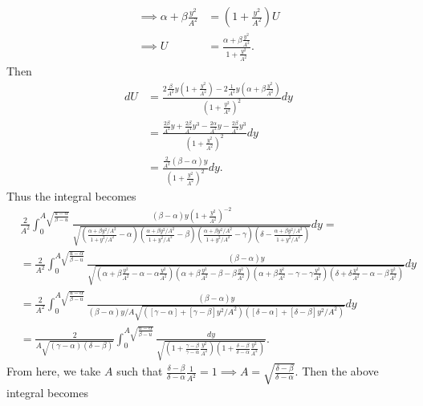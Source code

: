 \documentclass{article}
\begin{document}
\begin{itemize}
\begin{itemize}
\begin{align*}
            \implies \alpha + \beta\frac{y^2}{A^2} &= \left(1 + \frac{y^2}{A^2}\right)U\\
            \implies U &= \frac{\alpha + \beta \frac{y^2}{A^2}}{1 + \frac{y^2}{A^2}}.
        \end{align*}
        Then
        \begin{align*}
            dU &= \frac{2\frac{\beta}{A^2}y\left(1 + \frac{y^2}{A^2}\right) - 2\frac{1}{A^2}y\left(\alpha + \beta\frac{y^2}{A^2}\right)}{\left(1 + \frac{y^2}{A^2}\right)^2}dy\\
            &= \frac{\frac{2\beta}{A^2}y + \frac{2\beta}{A^4}y^3 - \frac{2\alpha}{A^2}y - \frac{2\beta}{A^4}y^3}{\left(1 + \frac{y^2}{A^2}\right)^2}dy\\
            &= \frac{\frac{2}{A^2}(\beta - \alpha)y}{\left(1 + \frac{y^2}{A^2}\right)^2}dy.
        \end{align*}
        Thus the integral becomes
        \begin{align*}
            &\frac{2}{A^2}\int_0^{A\sqrt{\frac{u - \alpha}{\beta - u}}}\frac{(\beta - \alpha)y\left(1 + \frac{y^2}{A^2}\right)^{-2}}{\sqrt{\left(\frac{\alpha + \beta y^2/A^2}{1 + y^2/A^2} - \alpha\right)\left(\frac{\alpha + \beta y^2/A^2}{1 + y^2/A^2} - \beta\right)\left(\frac{\alpha + \beta y^2/A^2}{1 + y^2/A^2} - \gamma\right)\left(\delta - \frac{\alpha + \beta y^2/A^2}{1 + y^2/A^2}\right)}}dy = \\
            &= \frac{2}{A^2}\int_0^{A\sqrt{\frac{u - \alpha}{\beta - u}}}\frac{(\beta - \alpha)y}{\sqrt{\left(\alpha + \beta \frac{y^2}{A^2}- \alpha - \alpha \frac{y^2}{A^2}\right)\left(\alpha + \beta \frac{y^2}{A^2} - \beta - \beta \frac{y^2}{A^2}\right)\left(\alpha + \beta \frac{y^2}{A^2} - \gamma - \gamma \frac{y^2}{A^2}\right)\left(\delta + \delta \frac{y^2}{A^2} - \alpha - \beta \frac{y^2}{A^2}\right)}}dy\\
            &= \frac{2}{A^2}\int_0^{A\sqrt{\frac{u - \alpha}{\beta - u}}}\frac{(\beta - \alpha)y}{(\beta - \alpha)y/A\sqrt{\left([\gamma - \alpha] + [\gamma - \beta]y^2/A^2\right)\left([\delta - \alpha] + [\delta - \beta]y^2/A^2\right)}}dy\\
            &= \frac{2}{A\sqrt{(\gamma - \alpha)(\delta - \beta)}}\int_0^{A\sqrt{\frac{u - \alpha}{\beta - u}}}\frac{dy}{\sqrt{\left(1+ \frac{\gamma - \beta}{\gamma - \alpha}\frac{y^2}{A^2}\right)\left(1 + \frac{\delta - \beta}{\delta - \alpha}\frac{y^2}{A^2}\right)}}.
        \end{align*}
        From here, we take $A$ such that $\frac{\delta - \beta}{\delta - \alpha}\frac{1}{A^2} = 1 \implies A = \sqrt{\frac{\delta - \beta}{\delta - \alpha}}$. Then the above integral becomes

\end{itemize}
\end{itemize}
\end{document}

